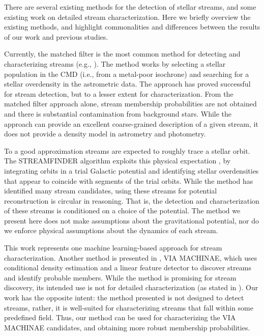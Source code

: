\documentclass[twocolumn, linenumbers]{aastex631}
\begin{document}
        There are several existing methods for the detection of stellar streams,
        and some existing work on detailed stream characterization. Here we
        briefly overview the existing methods, and highlight commonalities and
        differences between the results of our work and previous studies.

        Currently, the matched filter is the most common method for detecting
        and characterizing streams (e.g., \citealt{Rockosi+2002, Grillmair2014,
        Bonaca+2012, Jethwa+2018, Shipp+2018}).  The method works by selecting a
        stellar population in the CMD (i.e., from a metal-poor isochrone) and
        searching for a stellar overdensity in the astrometric data. The
        approach has proved successful for stream detection, but to a lesser
        extent for characterization. From the matched filter approach alone,
        stream membership probabilities are not obtained and there is
        substantial contamination from background stars. While the approach can
        provide an excellent coarse-grained description of a given stream, it
        does not provide a density model in astrometry and photometry. 

        To a good approximation streams are expected to roughly trace a stellar
        orbit. The STREAMFINDER algorithm exploits this physical expectation
        \citep{STREAMFINDER}, by integrating orbits in a trial Galactic
        potential and identifying stellar overdensities that appear to coincide
        with segments of the trial orbits. While the method has identified many
        stream candidates, using these streams for potential reconstruction is
        circular in reasoning. That is, the detection and characterization of
        these streams is conditioned on a choice of the potential. The method we
        present here does not make assumptions about the gravitational
        potential, nor do we enforce physical assumptions about the dynamics of
        each stream. 

        This work represents one machine learning-based approach for stream
        characterization. Another method is presented in \citet{Shih+2022}, VIA
        MACHINAE, which uses conditional density estimation and a linear feature
        detector to discover streams and identify probable members. While the
        method is promising for stream discovery, its intended use is not for
        detailed characterization (as stated in \citealt{Shih+2022}). Our work
        has the opposite intent: the method presented is not designed to detect
        streams, rather, it is well-suited for characterizing streams that fall
        within some predefined field. Thus, our method can be used for
        characterizing the VIA MACHINAE candidates, and obtaining more robust
        membership probabilities.
\end{document}
